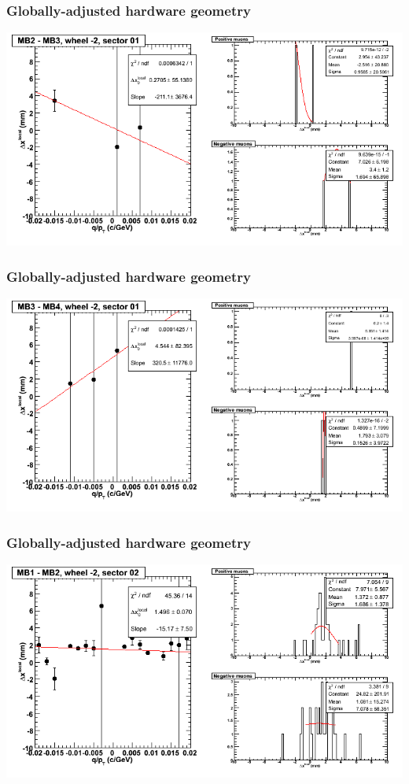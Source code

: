 \documentclass[compress]{beamer}
\begin{document}
\begin{frame}
\frametitle{Globally-adjusted hardware geometry}
\includegraphics[width=\linewidth]{NOV4_segdiffs_HW/dt13_resid_A_01_23.png}
\end{frame}

\begin{frame}
\frametitle{Globally-adjusted hardware geometry}
\includegraphics[width=\linewidth]{NOV4_segdiffs_HW/dt13_resid_A_01_34.png}
\end{frame}

\begin{frame}
\frametitle{Globally-adjusted hardware geometry}
\includegraphics[width=\linewidth]{NOV4_segdiffs_HW/dt13_resid_A_02_12.png}
\end{frame}
\end{document}
